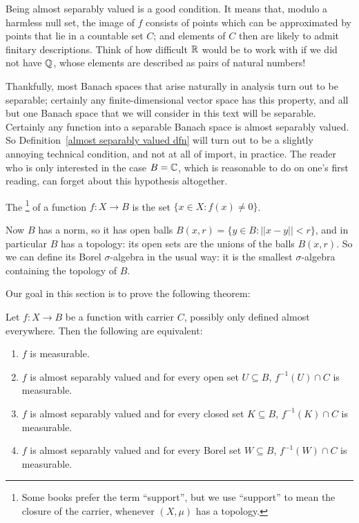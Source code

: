 \begin{subsec}
Being almost separably valued is a good condition. It means that, modulo a harmless null set, the image of $f$ consists of points which can be approximated by points that lie in a countable set $C$; and elements of $C$ then are likely to admit finitary descriptions.
Think of how difficult $\mathbb{R}$ would be to work with if we did not have $\mathbb{Q}$, whose elements are described as pairs of natural numbers!
\end{subsec}

\begin{subsec}
Thankfully, most Banach spaces that arise naturally in analysis turn out to be separable; certainly any finite-dimensional vector space has this property, and all but one Banach space that we will consider in this text will be separable.
Certainly any function into a separable Banach space is almost separably valued. So Definition~\ref{almost separably valued dfn} will turn out to be a slightly annoying technical condition, and not at all of import, in practice.
The reader who is only interested in the case $B = \mathbb{C}$, which is reasonable to do on one's first reading, can forget about this hypothesis altogether.
\end{subsec}

\begin{definition}
The \footnote{Some books prefer the term ``support'', but we use ``support'' to mean the closure of the carrier, whenever $(X, \mu)$ has a topology.} of a function $f: X \to B$ is the set $\{x \in X: f(x) \neq 0\}$.
\end{definition}

\begin{subsec}
Now $B$ has a norm, so it has open balls $B(x, r) = \{y \in B: ||x - y|| < r\}$, and in particular $B$ has a topology: its open sets are the unions of the balls $B(x, r)$.
So we can define its Borel $\sigma$-algebra in the usual way: it is the smallest $\sigma$-algebra containing the topology of $B$.
\end{subsec}

\begin{subsec}
Our goal in this section is to prove the following theorem:
\end{subsec}

\begin{theorem}
\label{characterization of measurable functions}
Let $f: X \to B$ be a function with carrier $C$, possibly only defined almost everywhere. Then the following are equivalent:
\begin{enumerate}
\item $f$ is measurable.
\item $f$ is almost separably valued and for every open set $U \subseteq B$, $f^{-1}(U) \cap C$ is measurable.
\item $f$ is almost separably valued and for every closed set $K \subseteq B$, $f^{-1}(K) \cap C$ is measurable.
\item $f$ is almost separably valued and for every Borel set $W \subseteq B$, $f^{-1}(W) \cap C$ is measurable.
\end{enumerate}
\end{theorem}

